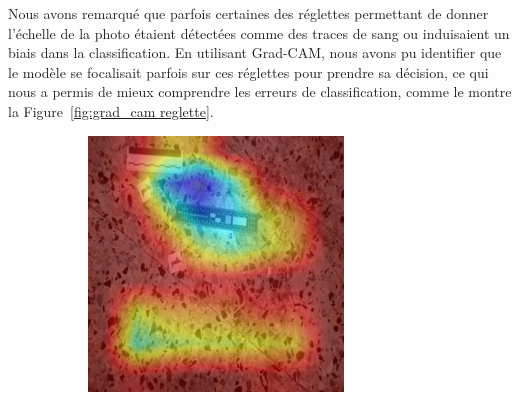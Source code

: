 Nous avons remarqué que parfois certaines des réglettes permettant de donner l'échelle de la photo étaient détectées comme des traces de sang ou induisaient un biais dans la classification.
En utilisant Grad-CAM, nous avons pu identifier que le modèle se focalisait parfois sur ces réglettes pour prendre sa décision, ce qui nous a permis de mieux comprendre les erreurs de classification, comme le montre la Figure~\ref{fig:grad_cam reglette}.

\begin{figure}[ht]
    \centering
    \begin{subfigure}{0.40\linewidth}
        \centering
        \includegraphics[width=\linewidth]{../asset/exemple/attention_reglette.jpg}
    \end{subfigure}
    \begin{subfigure}{0.40\linewidth}
        \centering

\end{subfigure}
\end{figure}
